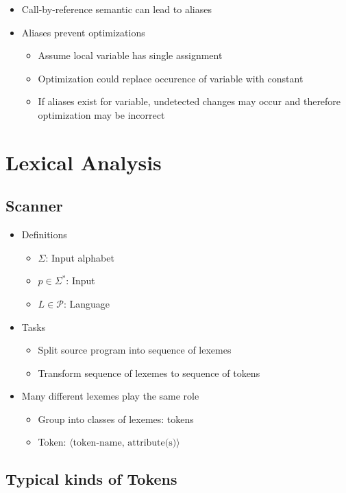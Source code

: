 \documentclass{scrartcl}
\begin{document}
\begin{itemize}
	\item Call-by-reference semantic can lead to aliases
	\item Aliases prevent optimizations
	\begin{itemize}
		\item Assume local variable has single assignment
		\item Optimization could replace occurence of variable with constant
		\item If aliases exist for variable, undetected changes may occur and therefore optimization may be incorrect
	\end{itemize}
\end{itemize}

\pagebreak
\section{Lexical Analysis}

\subsection{Scanner}

\begin{itemize}
	\item Definitions
	\begin{itemize}
		\item $ \Sigma $: Input alphabet
		\item $ p \in \Sigma^* $: Input
		\item $ L \in \mathcal{P} $: Language
	\end{itemize}
	\item Tasks
	\begin{itemize}
		\item Split source program into sequence of lexemes
		\item Transform sequence of lexemes to sequence of tokens
	\end{itemize}
	\item Many different lexemes play the same role
	\begin{itemize}
		\item Group into classes of lexemes: tokens
		\item Token: $ \langle \text{token-name, attribute(s)} \rangle $
	\end{itemize}
\end{itemize}

\subsection{Typical kinds of Tokens}
\end{document}
